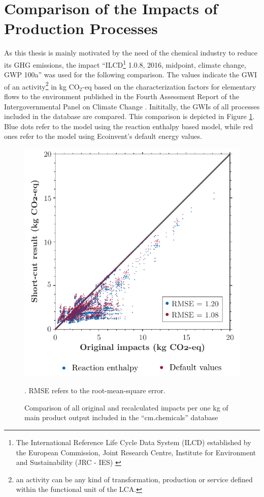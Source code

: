 \section{Comparison of the Impacts of Production Processes}
\label{sec:impacts}

As this thesis is mainly motivated by the need of the chemical industry to reduce its \acl{GHG} emissions, the impact ``ILCD\footnote{The International Reference Life Cycle Data System (ILCD) established by the European Commission, Joint Research Centre, Institute for Environment and Sustainability (JRC - IES) \cite{EuropeanCommissionJointResearchCentreInstituteforEnvironmentandSustainability.2012b}} 1.0.8, 2016, midpoint, climate change, GWP 100a'' \cite{EuropeanCommissionJointResearchCentreInstituteforEnvironmentandSustainability.2012d} was used for the following comparison. The values indicate the \acl{GWI} of an activity\footnote{an activity can be any kind of transformation, production or service defined within the functional unit of the LCA.} in kg CO$_2$-eq based on the characterization factors for elementary flows to the environment published in the Fourth Assessment Report of the Intergovernmental Panel on Climate Change \cite{IPCC.2007}. Inititally, the \aclp{GWI} of all processes included in the database are compared. This comparison is depicted in Figure \ref{fig:impacts all}. Blue dots refer to the model using the reaction enthalpy based model, while red ones refer to the model using Ecoinvent's default energy values.


\begin{figure}[htp!]
        \centering
        \includegraphics{images/complete_all.pdf}
        \caption{Comparison of all original and recalculated impacts per one kg of main product output included in the ``cm.chemicals'' database \cite{CarbonMindsGmbH.2020}}. RMSE refers to the root-mean-square error.
        \label{fig:impacts all}
\end{figure}

